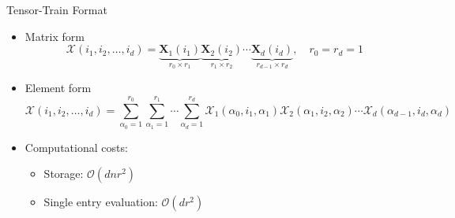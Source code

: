 \documentclass[aspectratio=169]{beamer}
\newcommand{\Mat}[1]{\mathbf{#1}}
\newcommand{\Tns}[1]{\mathcal{#1}}
\newcommand{\Ord}{\mathcal{O}}
\begin{document}
\begin{frame}{Tensor-Train Format}
  \begin{itemize}
    \item
      Matrix form
      \begin{equation*}
        \Tns{X}(i_1, i_2, \ldots, i_d) = \underbrace{\Mat{X}_1(i_1)}_{r_0 \times
        r_1} \underbrace{\Mat{X}_2(i_2)}_{r_1 \times r_2} \cdots
        \underbrace{\Mat{X}_d(i_d)}_{r_{d - 1} \times r_d}, \quad r_0 = r_d = 1
      \end{equation*}
    \item
      Element form
      \begin{equation*}
        \Tns{X}(i_1, i_2, \ldots, i_d) = \sum_{\alpha_0 = 1}^{r_0}
        \sum_{\alpha_1 = 1}^{r_1} \cdots \sum_{\alpha_d = 1}^{r_d}
        \Tns{X}_1(\alpha_0, i_1, \alpha_1) \Tns{X}_2(\alpha_1, i_2, \alpha_2)
        \cdots \Tns{X}_d(\alpha_{d - 1}, i_d, \alpha_d)
      \end{equation*}
    \item
      Computational costs:
      \begin{itemize}
        \item
          Storage: $\Ord(d n r^2)$
        \item
          Single entry evaluation: $\Ord(d r^2)$
      \end{itemize}
  \end{itemize}
\end{frame}
\end{document}
